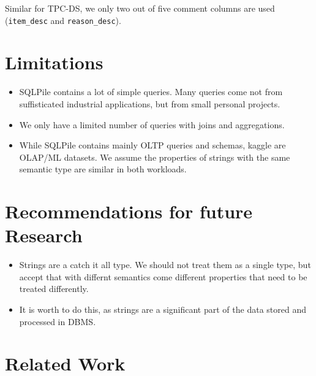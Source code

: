 Similar for TPC-DS, we only two out of five comment columns are used (\texttt{item\_desc} and \texttt{reason\_desc}).


\section{Limitations}\label{sec:limitations}
\begin{itemize}
    \item SQLPile contains a lot of simple queries. Many queries come not from suffisticated industrial applications, but
    from small personal projects.
    \item We only have a limited number of queries with joins and aggregations.
    \item While SQLPile contains mainly OLTP queries and schemas, kaggle are OLAP/ML datasets. We assume the properties of strings with
    the same semantic type are similar in both workloads.
\end{itemize}


\section{Recommendations for future Research}\label{sec:recommendations-for-future-research}

\begin{itemize}
    \item Strings are a catch it all type. We should not treat them as a single type, but accept that with differnt
    semantics come different properties that need to be treated differently.
    \item It is worth to do this, as strings are a significant part of the data stored and processed in DBMS.
\end{itemize}


\section{Related Work}\label{sec:related-work}

